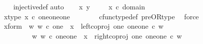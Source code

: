 \begin{isabellebody}
%
\isadelimproof
\ \ %
\endisadelimproof
%
\isatagproof
{}\isamarkupfalse%
\ injective{\isacharunderscore}{\kern0pt}def\isanewline
{}\isamarkupfalse%
{\isacharparenleft}{\kern0pt}auto{\isacharparenright}{\kern0pt}\isanewline
\ \ \isamarkupfalse%
\ x\ y\ \isanewline
\ \ \isamarkupfalse%
\ {\isachardoublequoteopen}x\ {\isasymin}\isactrlsub c\ domain\ {\isacharparenleft}{\kern0pt}{\isasymlangle}{\isasymt}{\isacharcomma}{\kern0pt}{\isasymt}{\isasymrangle}\ {\isasymamalg}\ {\isasymlangle}{\isasymt}{\isacharcomma}{\kern0pt}{\isasymf}{\isasymrangle}\ {\isasymamalg}\ {\isasymlangle}{\isasymf}{\isacharcomma}{\kern0pt}{\isasymt}{\isasymrangle}{\isacharparenright}{\kern0pt}{\isachardoublequoteclose}\ \isanewline
\ \ \isamarkupfalse%
\ \isamarkupfalse%
\ x{\isacharunderscore}{\kern0pt}type{\isacharcolon}{\kern0pt}\ {\isachardoublequoteopen}x\ {\isasymin}\isactrlsub c\ {\isacharparenleft}{\kern0pt}one{\isasymCoprod}{\isacharparenleft}{\kern0pt}one{\isasymCoprod}one{\isacharparenright}{\kern0pt}{\isacharparenright}{\kern0pt}{\isachardoublequoteclose}\ \ \isanewline
\ \ \ \ \isamarkupfalse%
\ cfunc{\isacharunderscore}{\kern0pt}type{\isacharunderscore}{\kern0pt}def\ pre{\isacharunderscore}{\kern0pt}OR{\isacharunderscore}{\kern0pt}type\ \isamarkupfalse%
\ force\isanewline
\ \ \isamarkupfalse%
\ \isamarkupfalse%
\ x{\isacharunderscore}{\kern0pt}form{\isacharcolon}{\kern0pt}\ {\isachardoublequoteopen}{\isacharparenleft}{\kern0pt}{\isasymexists}\ w{\isachardot}{\kern0pt}\ {\isacharparenleft}{\kern0pt}w\ {\isasymin}\isactrlsub c\ one\ {\isasymand}\ x\ {\isacharequal}{\kern0pt}\ {\isacharparenleft}{\kern0pt}left{\isacharunderscore}{\kern0pt}coproj\ one\ {\isacharparenleft}{\kern0pt}one{\isasymCoprod}one{\isacharparenright}{\kern0pt}{\isacharparenright}{\kern0pt}\ {\isasymcirc}\isactrlsub c\ w{\isacharparenright}{\kern0pt}{\isacharparenright}{\kern0pt}\isanewline
\ \ \ \ \ \ {\isasymor}\ \ {\isacharparenleft}{\kern0pt}{\isasymexists}\ w{\isachardot}{\kern0pt}\ {\isacharparenleft}{\kern0pt}w\ {\isasymin}\isactrlsub c\ {\isacharparenleft}{\kern0pt}one{\isasymCoprod}one{\isacharparenright}{\kern0pt}\ {\isasymand}\ x\ {\isacharequal}{\kern0pt}\ {\isacharparenleft}{\kern0pt}right{\isacharunderscore}{\kern0pt}coproj\ one\ {\isacharparenleft}{\kern0pt}one{\isasymCoprod}one{\isacharparenright}{\kern0pt}{\isacharparenright}{\kern0pt}\ {\isasymcirc}\isactrlsub c\ w{\isacharparenright}{\kern0pt}{\isacharparenright}{\kern0pt}{\isachardoublequoteclose}\isanewline

\end{isabellebody}
